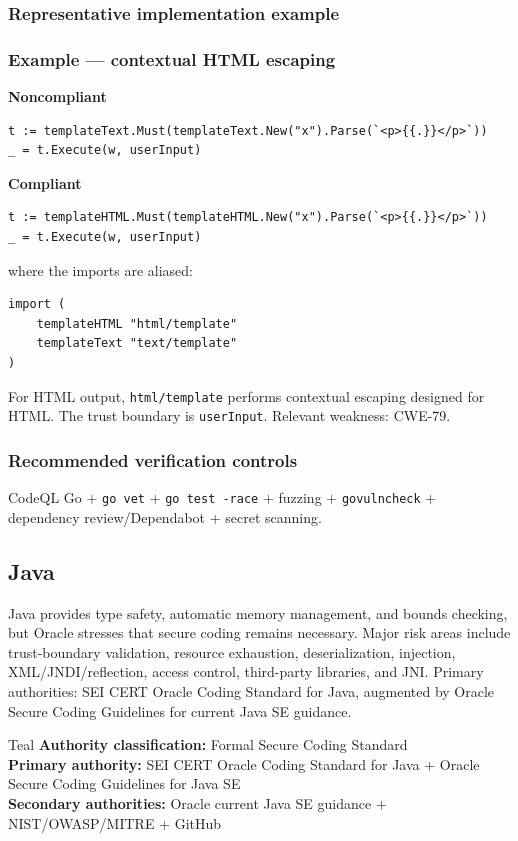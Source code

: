 \documentclass[10pt,letterpaper]{article}
\newcommand{\code}[1]{\texttt{\small #1}}
\begin{document}
\subsubsection*{Representative implementation example}
\subsubsection*{Example --- contextual HTML escaping}

\textbf{Noncompliant}\par
\begin{lstlisting}
t := templateText.Must(templateText.New("x").Parse(`<p>{{.}}</p>`))
_ = t.Execute(w, userInput)
\end{lstlisting}

\textbf{Compliant}\par
\begin{lstlisting}
t := templateHTML.Must(templateHTML.New("x").Parse(`<p>{{.}}</p>`))
_ = t.Execute(w, userInput)
\end{lstlisting}

where the imports are aliased:\par
\begin{lstlisting}
import (
    templateHTML "html/template"
    templateText "text/template"
)
\end{lstlisting}

For HTML output, \code{html/template} performs contextual escaping designed for HTML. The trust boundary is \code{userInput}. Relevant weakness: CWE-79.\par
\subsubsection*{Recommended verification controls}
CodeQL Go + \code{go vet} + \code{go test -race} + fuzzing + \code{govulncheck} + dependency review/Dependabot + secret scanning.
\clearpage
\subsection{Java}
Java provides type safety, automatic memory management, and bounds checking, but Oracle stresses that secure coding remains necessary. Major risk areas include trust-boundary validation, resource exhaustion, deserialization, injection, XML/JNDI/reflection, access control, third-party libraries, and JNI. Primary authorities: SEI CERT Oracle Coding Standard for Java, augmented by Oracle Secure Coding Guidelines for current Java SE guidance.
\begin{callout}{Teal}
\textbf{Authority classification:} Formal Secure Coding Standard\\
\textbf{Primary authority:} SEI CERT Oracle Coding Standard for Java + Oracle Secure Coding Guidelines for Java SE\\
\textbf{Secondary authorities:} Oracle current Java SE guidance + NIST/OWASP/MITRE + GitHub
\end{callout}
\end{document}
